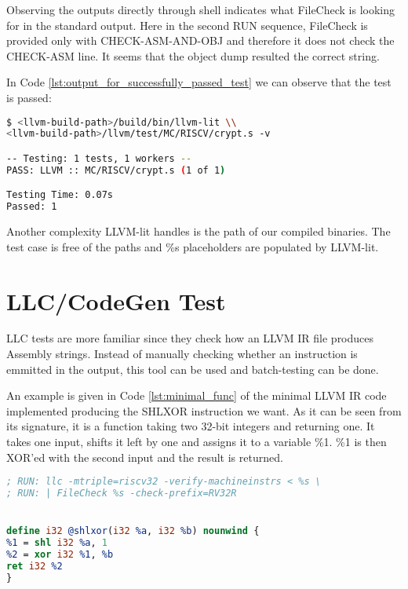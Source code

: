 Observing the outputs directly through shell indicates what FileCheck is looking for in the standard output. Here in the second RUN sequence, FileCheck is provided only with CHECK-ASM-AND-OBJ and therefore it does not check the CHECK-ASM line. It seems that the object dump resulted the correct string.

In Code \ref{lst:output_for_successfully_passed_test} we can observe that the test is passed:

\begin{minipage}{\linewidth}
\begin{lstlisting}[language=sh, caption={Output for successfully passed test}, label={lst:output_for_successfully_passed_test} ]
$ <llvm-build-path>/build/bin/llvm-lit \\
<llvm-build-path>/llvm/test/MC/RISCV/crypt.s -v

-- Testing: 1 tests, 1 workers --
PASS: LLVM :: MC/RISCV/crypt.s (1 of 1)

Testing Time: 0.07s
Passed: 1
\end{lstlisting}
\end{minipage}

Another complexity LLVM-lit handles is the path of our compiled binaries. The test case is free of the paths and \%s placeholders are populated by LLVM-lit.



\section{LLC/CodeGen Test}\label{sec:llc_test}
LLC tests are more familiar since they check how an LLVM IR file produces Assembly strings. Instead of manually checking whether an instruction is emmitted in the output, this tool can be used and batch-testing can be done.

An example is given in Code \ref{lst:minimal_func} of the minimal LLVM IR code implemented producing the SHLXOR instruction we want. As it can be seen from its signature, it is a function taking two 32-bit integers and returning one. It takes one input, shifts it left by one and assigns it to a variable \%1. \%1 is then XOR’ed with the second input and the result is returned.

\begin{lstlisting}[language=llvm,style=nasm, caption={Minimal shlxor producing LLVM IR}, label={lst:minimal_func} ]
; RUN: llc -mtriple=riscv32 -verify-machineinstrs < %s \ 
; RUN: | FileCheck %s -check-prefix=RV32R 


define i32 @shlxor(i32 %a, i32 %b) nounwind { 
%1 = shl i32 %a, 1 
%2 = xor i32 %1, %b 
ret i32 %2 
} 
\end{lstlisting}




